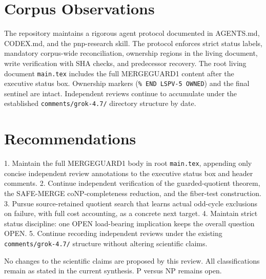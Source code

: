 \documentclass{article}
\begin{document}
\section{Corpus Observations}
The repository maintains a rigorous agent protocol documented in AGENTS.md, CODEX.md, and the pnp-research skill. The protocol enforces strict status labels, mandatory corpus-wide reconciliation, ownership regions in the living document, write verification with SHA checks, and predecessor recovery. The root living document \texttt{main.tex} includes the full MERGEGUARD1 content after the executive status box. Ownership markers (\texttt{\% END LSPV-5 OWNED}) and the final sentinel are intact. Independent reviews continue to accumulate under the established \texttt{comments/grok-4.7/} directory structure by date.

\section{Recommendations}
1. Maintain the full MERGEGUARD1 body in root \texttt{main.tex}, appending only concise independent review annotations to the executive status box and header comments.
2. Continue independent verification of the guarded-quotient theorem, the SAFE-MERGE coNP-completeness reduction, and the fiber-test construction.
3. Pursue source-retained quotient search that learns actual odd-cycle exclusions on failure, with full cost accounting, as a concrete next target.
4. Maintain strict status discipline: one OPEN load-bearing implication keeps the overall question OPEN.
5. Continue recording independent reviews under the existing \texttt{comments/grok-4.7/} structure without altering scientific claims.

No changes to the scientific claims are proposed by this review. All classifications remain as stated in the current synthesis. P versus NP remains open.
\end{document}
